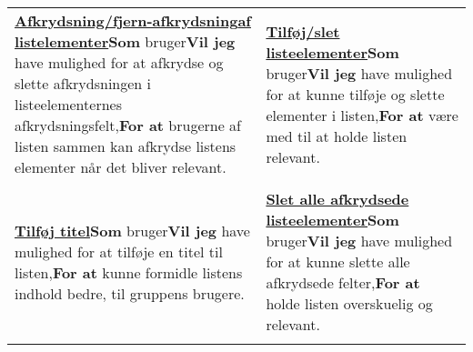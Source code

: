 \begin{tabular}{p{2.5in}p{2.5in}}
\textbf{\underline{Afkrydsning/fjern-afkrydsning}}\newline \textbf{\underline{af listelementer}}\newline \textbf{Som} bruger\newline \textbf{Vil jeg} have mulighed for at afkrydse og slette afkrydsningen i listeelementernes afkrydsningsfelt,\newline \textbf{For at} brugerne af listen sammen kan afkrydse listens elementer når det bliver relevant. & 

\textbf{\underline{Tilføj/slet listeelementer}}\newline \textbf{Som} bruger\newline \textbf{Vil jeg} have mulighed for at kunne tilføje og slette elementer i listen,\newline \textbf{For at} være med til at holde listen relevant.  \\\\

\textbf{\underline{Tilføj titel}}\newline \textbf{Som} bruger\newline \textbf{Vil jeg}  have mulighed for at tilføje en titel til listen,\newline \textbf{For at} kunne formidle listens indhold bedre, til gruppens brugere.  & 

\textbf{\underline{Slet alle afkrydsede listeelementer}}\newline \textbf{Som} bruger\newline \textbf{Vil jeg} have mulighed for at kunne slette alle afkrydsede felter,\newline \textbf{For at} holde listen overskuelig og relevant.  \\\\  
\end{tabular}